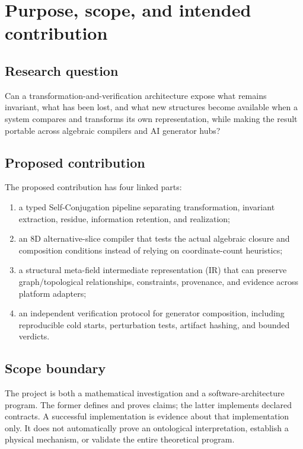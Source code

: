 \documentclass[11pt,oneside]{article}
\begin{document}
\tableofcontents
\newpage

\section{Purpose, scope, and intended contribution}
\subsection{Research question}
Can a transformation-and-verification architecture expose what remains invariant, what has been lost, and what new structures become available when a system compares and transforms its own representation, while making the result portable across algebraic compilers and AI generator hubs?

\subsection{Proposed contribution}
The proposed contribution has four linked parts:
\begin{enumerate}
  \item a typed Self-Conjugation pipeline separating transformation, invariant extraction, residue, information retention, and realization;
  \item an 8D alternative-slice compiler that tests the actual algebraic closure and composition conditions instead of relying on coordinate-count heuristics;
  \item a structural meta-field intermediate representation (IR) that can preserve graph/topological relationships, constraints, provenance, and evidence across platform adapters;
  \item an independent verification protocol for generator composition, including reproducible cold starts, perturbation tests, artifact hashing, and bounded verdicts.
\end{enumerate}

\subsection{Scope boundary}
The project is both a mathematical investigation and a software-architecture program. The former defines and proves claims; the latter implements declared contracts. A successful implementation is evidence about that implementation only. It does not automatically prove an ontological interpretation, establish a physical mechanism, or validate the entire theoretical program.
\end{document}
